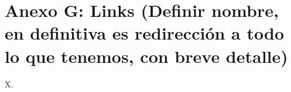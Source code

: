 \section{Anexo G: Links (Definir nombre, en definitiva es redirección a todo lo que tenemos, con breve detalle)}

X.
